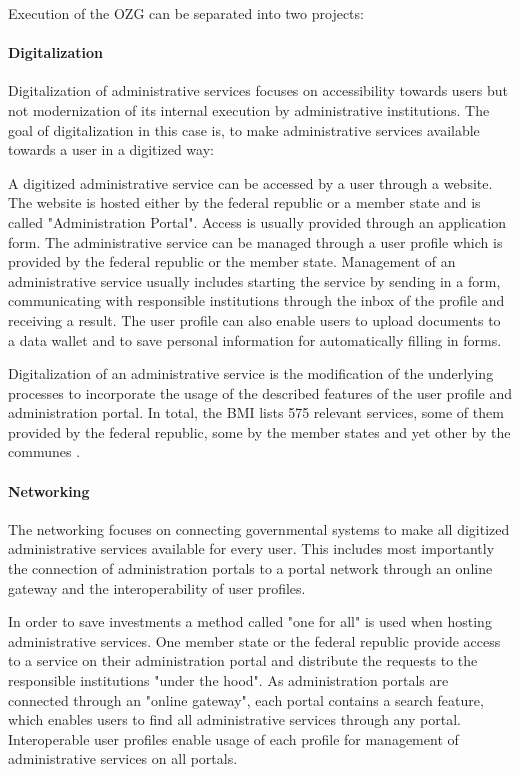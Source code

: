 \documentclass[
     12pt,         %
     a4paper,      %
     BCOR=10mm,version=first,     %
     DIV=14,version=first,        %
     ]{scrreprt}
\begin{document}
Execution of the OZG can be separated into two projects:

\paragraph{Digitalization}
Digitalization of administrative services focuses on accessibility towards users but not modernization of its internal execution by administrative institutions. The goal of digitalization in this case is, to make administrative services available towards a user in a digitized way:

A digitized administrative service can be accessed by a user through a website. The website is hosted either by the federal republic or a member state and is called "Administration Portal". Access is usually provided through an application form. The administrative service can be managed through a user profile which is provided by the federal republic or the member state. Management of an administrative service usually includes starting the service by sending in a form, communicating with responsible institutions through the inbox of the profile and receiving a result. The user profile can also enable users to upload documents to a data wallet and to save personal information for automatically filling in forms.

Digitalization of an administrative service is the modification of the underlying processes to incorporate the usage of the described features of the user profile and administration portal. In total, the BMI lists 575 relevant services, some of them provided by the federal republic, some by the member states and yet other by the communes \cite{BMI:Onlinezugangsgesetz}.

\paragraph{Networking}
The networking focuses on connecting governmental systems to make all digitized administrative services available for every user. This includes most importantly the connection of administration portals to a portal network through an online gateway and the interoperability of user profiles.

In order to save investments a method called "one for all" is used when hosting administrative services. One member state or the federal republic provide access to a service on their administration portal and distribute the requests to the responsible institutions "under the hood". As administration portals are connected through an "online gateway", each portal contains a search feature, which enables users to find all administrative services through any portal. Interoperable user profiles enable usage of each profile for management of administrative services on all portals.
\end{document}

